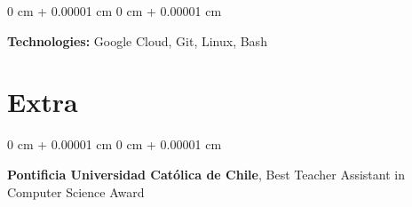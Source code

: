 \documentclass[10pt, letterpaper]{article}
\newenvironment{onecolentry}{
    \begin{adjustwidth}{
        0 cm + 0.00001 cm
    }{
        0 cm + 0.00001 cm
    }
}{
    \end{adjustwidth}
} %
\newenvironment{twocolentry}[2][]{
    \onecolentry
    \def\secondColumn{#2}
    \setcolumnwidth{\fill, 4.5 cm}
    \begin{paracol}{2}
}{
    \switchcolumn \raggedleft \secondColumn
    \end{paracol}
    \endonecolentry
} %
\begin{document}
        \vspace{0.2 cm}

        \begin{onecolentry}
            \textbf{Technologies:} Google Cloud, Git, Linux, Bash
        \end{onecolentry}
    
    \section{Extra}
    \begin{twocolentry}{
        2020
    }
    \textbf{Pontificia Universidad Católica de Chile}, Best Teacher Assistant in Computer Science Award
    \end{twocolentry}


    
\end{document}
